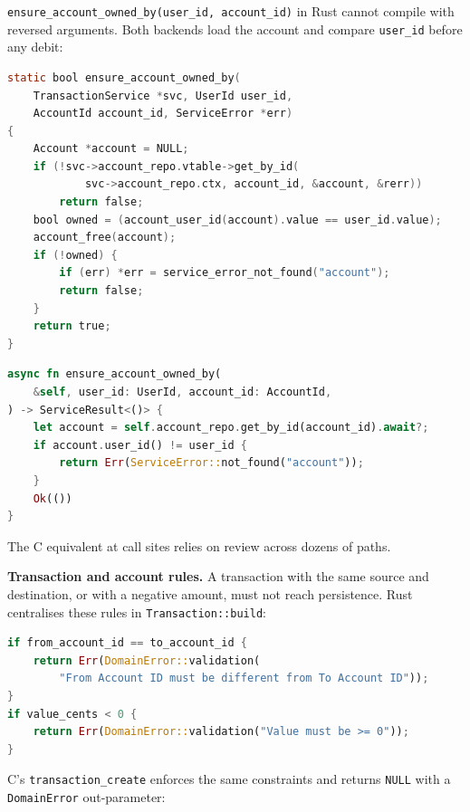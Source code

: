 \texttt{ensure\_account\_owned\_by(user\_id, account\_id)} in Rust cannot compile with
reversed arguments. Both backends load the account and compare \texttt{user\_id} before
any debit:

\begin{lstlisting}[language=C, caption={transaction\_service.c --- Ownership check
before \texttt{record\_transfer\_for\_user} delegates to the core recorder.}]
static bool ensure_account_owned_by(
    TransactionService *svc, UserId user_id,
    AccountId account_id, ServiceError *err)
{
    Account *account = NULL;
    if (!svc->account_repo.vtable->get_by_id(
            svc->account_repo.ctx, account_id, &account, &rerr))
        return false;
    bool owned = (account_user_id(account).value == user_id.value);
    account_free(account);
    if (!owned) {
        if (err) *err = service_error_not_found("account");
        return false;
    }
    return true;
}
\end{lstlisting}

\begin{lstlisting}[language=Rust, caption={transaction.rs (service) --- Same rule;
wrong owner becomes \texttt{NotFound}, not a debit attempt.}]
async fn ensure_account_owned_by(
    &self, user_id: UserId, account_id: AccountId,
) -> ServiceResult<()> {
    let account = self.account_repo.get_by_id(account_id).await?;
    if account.user_id() != user_id {
        return Err(ServiceError::not_found("account"));
    }
    Ok(())
}
\end{lstlisting}

The C equivalent at call sites relies on review across dozens of paths.

\medskip\noindent\textbf{Transaction and account rules.}\quad
A transaction with the same source and destination, or with a negative amount, must not
reach persistence. Rust centralises these rules in \texttt{Transaction::build}:

\begin{lstlisting}[language=Rust, caption={transaction.rs (domain) --- Illegal states
are rejected before a \texttt{Transaction} value exists.}]
if from_account_id == to_account_id {
    return Err(DomainError::validation(
        "From Account ID must be different from To Account ID"));
}
if value_cents < 0 {
    return Err(DomainError::validation("Value must be >= 0"));
}
\end{lstlisting}

C's \texttt{transaction\_create} enforces the same constraints and returns \texttt{NULL}
with a \texttt{DomainError} out-parameter:

